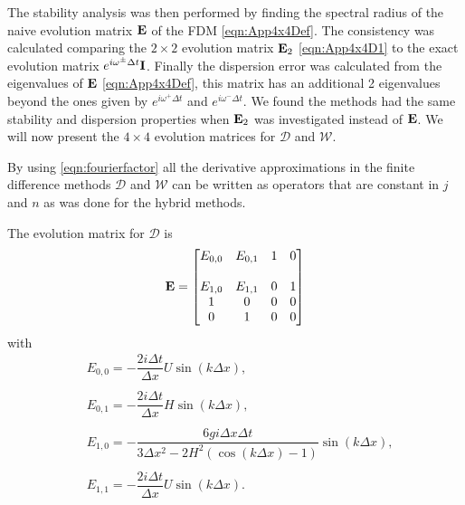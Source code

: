 The stability analysis was then performed by finding the spectral radius of the naive evolution matrix $\mathbf{E}$ of the FDM \eqref{eqn:App4x4Def}. The consistency was calculated comparing the $2\times2$ evolution matrix $\mathbf{E}_2$ \eqref{eqn:App4x4D1} to the exact evolution matrix $e^{i \omega^\pm \Delta t}\mathbf{I} $. Finally the dispersion error was calculated from the eigenvalues of $\mathbf{E}$ \eqref{eqn:App4x4Def}, this matrix has an additional 2 eigenvalues beyond the ones given by $e^{i \omega^+ \Delta t}$ and $e^{i \omega^- \Delta t}$. We found the methods had the same stability and dispersion properties when $\mathbf{E}_2$ was investigated instead of $\mathbf{E}$. We will now present the $4\times4$ evolution matrices for $\mathcal{D}$ and $\mathcal{W}$.



By using \eqref{eqn:fourierfactor} all the derivative approximations in the finite difference methods $\mathcal{D}$ and $\mathcal{W}$ can be written as operators that are constant in $j$ and $n$ as was done for the hybrid methods.

The evolution matrix for $\mathcal{D}$ is 
 \begin{equation}
\label{eqn:AppEvolD}
\mathbf{E} = \begin{bmatrix}
{E}_{0,0} & {E}_{0,1}  & 1 &0 \\ \\
{E}_{1,0} & {E}_{1,1}  & 0 &1 \\
1  & 0  &0 &0 \\
0  & 1  &0 &0 
\end{bmatrix} 
\end{equation}
with
\begin{align*}
&{E}_{0,0} = -  \dfrac{2 i\Delta t }{\Delta x} U\sin\left(k \Delta x\right) , \\ \\
&{E}_{0,1} = -  \dfrac{2 i\Delta t}{\Delta x} H \sin\left(k \Delta x\right),\\ \\
& {E}_{1,0} =-\dfrac{6 gi \Delta x\Delta t}{3 \Delta x^2 -2{H^2} \left( \cos\left(k \Delta x\right) - 1 \right)}{ \sin\left(k \Delta x\right)}, \\\\
& {E}_{1,1} =-\dfrac{2i \Delta t }{\Delta x} U \sin\left(k \Delta x\right).
\end{align*}




